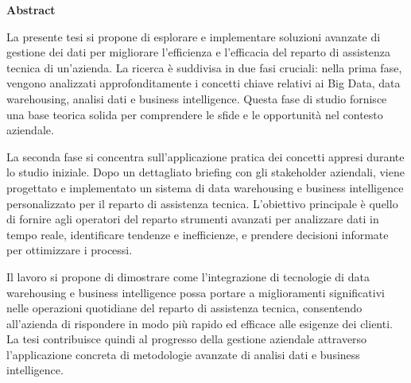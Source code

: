 \label{Abstract}

\begin{center}

\Large
\textbf{Abstract}
    
\end{center}


La presente tesi si propone di esplorare e implementare soluzioni avanzate di gestione dei dati per migliorare l'efficienza e l'efficacia del reparto di assistenza tecnica di un'azienda. La ricerca è suddivisa in due fasi cruciali: nella prima fase, vengono analizzati approfonditamente i concetti chiave relativi ai Big Data, data warehousing, analisi dati e business intelligence. Questa fase di studio fornisce una base teorica solida per comprendere le sfide e le opportunità nel contesto aziendale.

La seconda fase si concentra sull'applicazione pratica dei concetti appresi durante lo studio iniziale. Dopo un dettagliato briefing con gli stakeholder aziendali, viene progettato e implementato un sistema di data warehousing e business intelligence personalizzato per il reparto di assistenza tecnica. L'obiettivo principale è quello di fornire agli operatori del reparto strumenti avanzati per analizzare dati in tempo reale, identificare tendenze e inefficienze, e prendere decisioni informate per ottimizzare i processi.

Il lavoro si propone di dimostrare come l'integrazione di tecnologie di data warehousing e business intelligence possa portare a miglioramenti significativi nelle operazioni quotidiane del reparto di assistenza tecnica, consentendo all'azienda di rispondere in modo più rapido ed efficace alle esigenze dei clienti. La tesi contribuisce quindi al progresso della gestione aziendale attraverso l'applicazione concreta di metodologie avanzate di analisi dati e business intelligence.